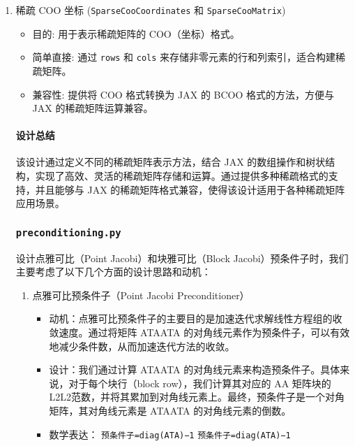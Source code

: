 \documentclass{ctexart}
\begin{document}
\begin{enumerate}
\item 稀疏 COO 坐标 (\texttt{SparseCooCoordinates} 和 \texttt{SparseCooMatrix})

\begin{itemize}
	\item 目的: 用于表示稀疏矩阵的 COO（坐标）格式。

	\item 简单直接: 通过 \texttt{rows} 和 \texttt{cols} 来存储非零元素的行和列索引，适合构建稀疏矩阵。

	\item 兼容性: 提供将 COO 格式转换为 JAX 的 BCOO 格式的方法，方便与 JAX 的稀疏矩阵运算兼容。
\end{itemize}

\paragraph{设计总结}

该设计通过定义不同的稀疏矩阵表示方法，结合 JAX 的数组操作和树状结构，实现了高效、灵活的稀疏矩阵存储和运算。通过提供多种稀疏格式的支持，并且能够与 JAX 的稀疏矩阵格式兼容，使得该设计适用于各种稀疏矩阵应用场景。

\subsubsection{\texttt{preconditioning.py}}

设计点雅可比（Point Jacobi）和块雅可比（Block Jacobi）预条件子时，我们主要考虑了以下几个方面的设计思路和动机：
\begin{enumerate}
	\item 点雅可比预条件子（Point Jacobi Preconditioner）

	      \begin{itemize}
		      \item 动机：点雅可比预条件子的主要目的是加速迭代求解线性方程组的收敛速度。通过将矩阵 ATAATA 的对角线元素作为预条件子，可以有效地减少条件数，从而加速迭代方法的收敛。

		      \item 设计：我们通过计算 ATAATA 的对角线元素来构造预条件子。具体来说，对于每个块行（block row），我们计算其对应的 AA 矩阵块的 L2L2​ 范数，并将其累加到对角线元素上。最终，预条件子是一个对角矩阵，其对角线元素是 ATAATA 的对角线元素的倒数。

		      \item 数学表达：
		            \texttt{预条件子=diag(ATA)−1}
		            \texttt{预条件子=diag(ATA)−1}


\end{itemize}
\end{enumerate}
\end{enumerate}
\end{document}
